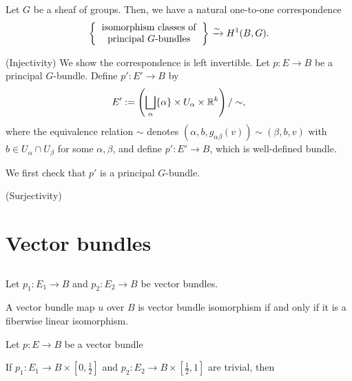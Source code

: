 \documentclass{../note}
\begin{document}
\begin{prb}
Let $G$ be a sheaf of groups.
Then, we have a natural one-to-one correspondence
\[\left\{\begin{tabular}{c}isomorphism classes of\\principal $G$-bundles\end{tabular}\right\}\xrightarrow{\sim}H^1(B,G).\]
\end{prb}
\begin{pf}
(Injectivity)
We show the correspondence is left invertible.
Let $p:E\to B$ be a principal $G$-bundle.
Define $p':E'\to B$ by
\[E':=\left(\bigsqcup_\alpha\{\alpha\}\times U_\alpha\times\mathbb{R}^k\right)/\sim,\]
where the equivalence relation $\sim$ denotes $(\alpha,b,g_{\alpha\beta}(v))\sim(\beta,b,v)$ with $b\in U_\alpha\cap U_\beta$ for some $\alpha,\beta$, and define $p':E'\to B$, which is well-defined bundle.

We first check that $p'$ is a principal $G$-bundle.

(Surjectivity)
\end{pf}






\chapter{Vector bundles}
\section{}
\begin{prb}

\end{prb}

\begin{prb}
Let $p_1:E_1\to B$ and $p_2:E_2\to B$ be vector bundles.
\begin{parts}
\item A vector bundle map $u$ over $B$ is vector bundle isomorphism if and only if it is a fiberwise linear isomorphism.
\end{parts}
\end{prb}

\begin{prb}
\end{prb}

\begin{prb}
Let $p:E\to B$ be a vector bundle

If $p_1:E_1\to B\times[0,\frac12]$ and $p_2:E_2\to B\times[\frac12,1]$ are trivial, then 
\begin{parts}
\item 
\end{parts}
\end{prb}
\end{document}
